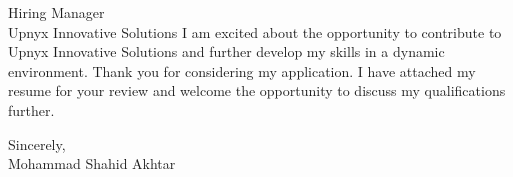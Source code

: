\documentclass[10.5pt]{letter}
\begin{document}
\begin{letter}{Hiring Manager\\Upnyx Innovative Solutions}
\vspace{0.5cm}
I am excited about the opportunity to contribute to Upnyx Innovative Solutions and further develop my skills in a dynamic environment. Thank you for considering my application. I have attached my resume for your review and welcome the opportunity to discuss my qualifications further.

\vspace{0.5cm}

\begin{flushleft}
\vspace{0.3cm}
Sincerely,\\[2ex]
Mohammad Shahid Akhtar
\end{flushleft}

\end{letter}
\end{document}
